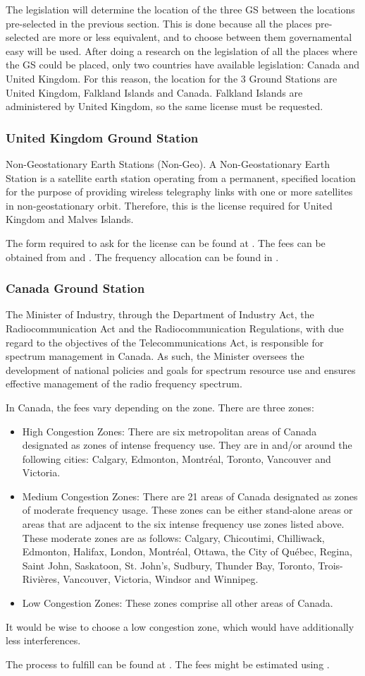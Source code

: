 The legislation will determine the location of the three GS between the locations pre-selected in the previous section. This is done because all the places pre-selected are more or less equivalent, and to choose between them governamental easy will be used. After doing a research on the legislation of all the places where the GS could be placed, only two countries have available legislation: Canada and United Kingdom. For this reason, the location for the 3 Ground Stations are United Kingdom, Falkland Islands and Canada. Falkland Islands are administered by United Kingdom, so the same license must be requested.

\subsubsection{United Kingdom Ground Station}
Non-Geostationary Earth Stations (Non-Geo). A Non-Geostationary Earth Station is a satellite earth station operating from a permanent, specified location for the purpose of providing wireless telegraphy links with one or more satellites in non-geostationary orbit. Therefore, this is the license required for United Kingdom and Malves Islands.

The form required to ask for the license can be found at \cite{UKForm}. The fees can be obtained from \cite{UKFees} and \cite{UKMHzFees}. The frequency allocation can be found in \cite{UKAllocation}.

\subsubsection{Canada Ground Station}
The Minister of Industry, through the Department of Industry Act, the Radiocommunication Act and the Radiocommunication Regulations, with due regard to the objectives of the Telecommunications Act, is responsible for spectrum management in Canada. As such, the Minister oversees the development of national policies and goals for spectrum resource use and ensures effective management of the radio frequency spectrum.

In Canada, the fees vary depending on the zone. There are three zones:
\begin{itemize}
\item High Congestion Zones: There are six metropolitan areas of Canada designated as zones of intense frequency use. They are in and/or around the following cities: Calgary, Edmonton, Montréal, Toronto, Vancouver and Victoria.
\item Medium Congestion Zones: There are 21 areas of Canada designated as zones of moderate frequency usage. These zones can be either stand-alone areas or areas that are adjacent to the six intense frequency use zones listed above. These moderate zones are as follows: Calgary, Chicoutimi, Chilliwack, Edmonton, Halifax, London, Montréal, Ottawa, the City of Québec, Regina, Saint John, Saskatoon, St. John's, Sudbury, Thunder Bay, Toronto, Trois-Rivières, Vancouver, Victoria, Windsor and Winnipeg.
\item Low Congestion Zones: These zones comprise all other areas of Canada.
\end{itemize}

It would be wise to choose a low congestion zone, which would have additionally less interferences. 

The process to fulfill can be found at \cite{CndForm}. The fees might be estimated using \cite{CndFees}.